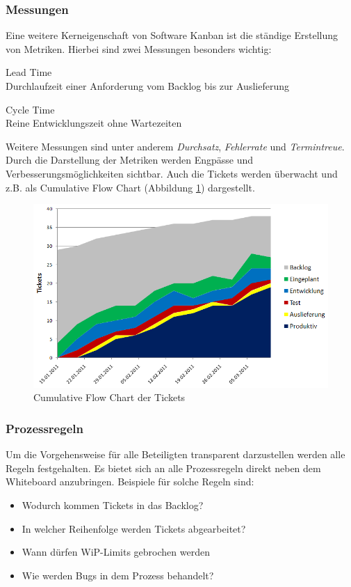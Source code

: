 \subsubsection{Messungen}
Eine weitere Kerneigenschaft von Software Kanban ist die ständige Erstellung von Metriken. Hierbei sind zwei Messungen besonders wichtig:
\begin{description}
  \item Lead Time\\ Durchlaufzeit einer Anforderung vom Backlog bis zur Auslieferung
  \item Cycle Time\\ Reine Entwicklungszeit ohne Wartezeiten
\end{description}
Weitere Messungen sind unter anderem \emph{Durchsatz}, \emph{Fehlerrate} und \emph{Termintreue}. Durch die Darstellung der Metriken werden Engpässe und Ver\-besserungs\-mög\-lich\-keit\-en sichtbar. Auch die Tickets werden überwacht und z.B. als Cumulative Flow Chart (Abbildung \ref{fig:kanbanChart}) dargestellt.

\begin{figure}[h]
  \centering
  \includegraphics[width=1\textwidth]{images/kanbanChart}
  \caption{Cumulative Flow Chart der Tickets}
  \label{fig:kanbanChart}
\end{figure}

\subsubsection{Prozessregeln}
Um die Vorgehensweise für alle Beteiligten transparent dar\-zu\-stellen werden alle Regeln festgehalten. Es bietet sich an alle Prozessregeln direkt neben dem Whiteboard anzubringen. Beispiele für solche Regeln sind:
\begin{itemize}
  \item Wodurch kommen Tickets in das Backlog?
  \item In welcher Reihenfolge werden Tickets abgearbeitet?
  \item Wann dürfen WiP-Limits gebrochen werden
  \item Wie werden Bugs in dem Prozess behandelt?
\end{itemize}

